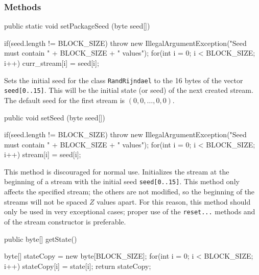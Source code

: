 \subsubsection* {Methods}
\begin{code}
   public static void setPackageSeed (byte seed[]) \begin{hide} {
      if(seed.length != BLOCK_SIZE)
         throw new IllegalArgumentException("Seed must contain " +
                                            BLOCK_SIZE + " values");
      for(int i = 0; i < BLOCK_SIZE; i++)
         curr_stream[i] = seed[i];
   } \end{hide}
\end{code}
\begin{tabb} Sets the initial seed for the class \texttt{RandRijndael} to the
  16 bytes of the vector \texttt{seed[0..15]}.
  This will be the initial state (or seed) of the next created stream.
  The default seed for the first stream is $(0, 0, \ldots, 0, 0)$.
\end{tabb}
\begin{htmlonly}
\end{htmlonly}
\begin{code}

   public void setSeed (byte seed[]) \begin{hide} {
      if(seed.length != BLOCK_SIZE)
         throw new IllegalArgumentException("Seed must contain " +
                                            BLOCK_SIZE + " values");
      for(int i = 0; i < BLOCK_SIZE; i++)
         stream[i] = seed[i];
   } \end{hide}
\end{code}
\begin{tabb} This method is discouraged for normal use.
  Initializes the stream at the beginning of a stream with the initial
  seed \texttt{seed[0..15]}.
  This method only affects the specified stream; the others are not modified,
  so the beginning of the streams will not be spaced $Z$ values apart.
  For this reason, this method should only be used in very
  exceptional cases; proper use of the \texttt{reset...} methods
  and of the stream constructor is preferable.
\end{tabb}
\begin{htmlonly}
\end{htmlonly}
\begin{code}

   public byte[] getState() \begin{hide} {
      byte[] stateCopy = new byte[BLOCK_SIZE];
      for(int i = 0; i < BLOCK_SIZE; i++)
         stateCopy[i] = state[i];
      return stateCopy;
   } \end{hide}
\end{code}
